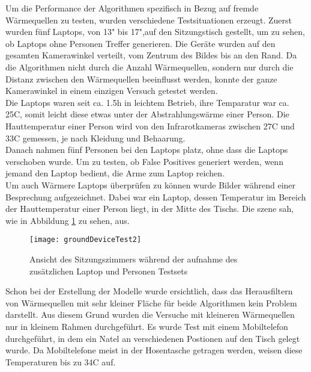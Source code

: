 Um die Performance der Algorithmen spezifisch in Bezug auf fremde Wärmequellen zu testen, wurden verschiedene Testsituationen erzeugt. Zuerst wurden fünf Laptops, von 13" bis 17",auf den Sitzungstisch gestellt, um zu sehen, ob Laptops ohne Personen Treffer generieren. Die Geräte wurden auf den gesamten Kamerawinkel verteilt, vom Zentrum des Bildes bis an den Rand. Da die Algorithmen nicht durch die Anzahl Wärmequellen, sondern nur durch die Distanz zwischen den Wärmequellen beeinflusst werden, konnte der ganze Kamerawinkel in einem einzigen Versuch getestet werden.\\
Die Laptops waren seit ca. 1.5h in leichtem Betrieb, ihre Temparatur war ca. 25\degree C, somit leicht diese etwas unter der Abstrahlungswärme einer Person. Die Hauttemperatur einer Person wird von den Infrarotkameras zwischen 27\degree C und 33\degree C gemessen, je nach Kleidung und Behaarung.\\
Danach nahmen fünf Personen bei den Laptops platz,  ohne dass die Laptops verschoben wurde. Um zu testen, ob False Positives generiert werden, wenn jemand den Laptop bedient, die Arme zum Laptop reichen.\\
Um auch Wärmere Laptops überprüfen zu können wurde Bilder während einer Besprechung aufgezeichnet. Dabei war ein Laptop, dessen Temperatur im Bereich der Hauttemperatur einer Person liegt, in der Mitte des Tischs. Die szene sah, wie in Abbildung \ref{fig:groundDeviceTest2} zu sehen, aus.
\\
\begin{figure}[H]
	\centering
	\texttt{[image: groundDeviceTest2]}
	\caption{Ansicht des Sitzungszimmers während der aufnahme des zusätzlichen Laptop und Personen Testsets}
	\label{fig:groundDeviceTest2}
\end{figure}
Schon bei der Erstellung der Modelle wurde ersichtlich, dass das Herausfiltern von Wärmequellen mit sehr kleiner Fläche für beide Algorithmen kein Problem darstellt. Aus diesem Grund wurden die Versuche mit kleineren Wärmequellen nur in kleinem Rahmen durchgeführt. Es wurde Test mit einem Mobiltelefon durchgeführt, in dem ein Natel an verschiedenen Postionen auf den Tisch gelegt wurde. Da Mobiltelefone meist in der Hosentasche getragen werden, weisen diese Temperaturen bis zu 34\degree C auf.\\
\\


